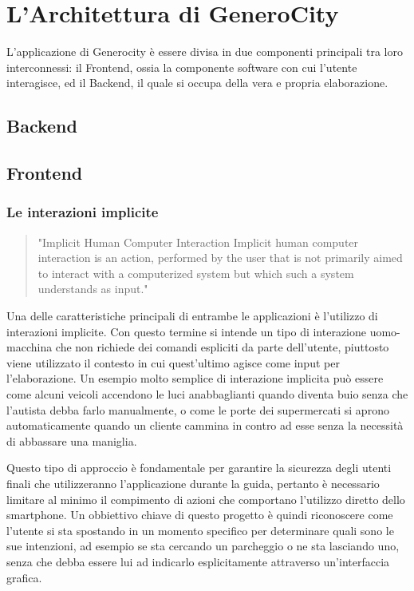 \chapter{L'Architettura di GeneroCity}

L'applicazione di Generocity è essere divisa in due componenti principali tra loro interconnessi:  il Frontend, ossia la componente software  con cui l'utente interagisce, ed il Backend, il quale si occupa della vera e propria elaborazione.
\section{Backend}
\section{Frontend}
\subsection{Le interazioni implicite}
\begin{quote}
"Implicit Human Computer Interaction
Implicit human computer interaction is an action,
performed by the user that is not primarily aimed
to interact with a computerized system but which
such a system understands as input."\cite{implicit-interaction}
\end{quote}
Una delle caratteristiche principali di entrambe le applicazioni è l'utilizzo di interazioni implicite. Con questo termine si intende un tipo di interazione uomo-macchina che non richiede dei comandi espliciti da parte dell'utente, piuttosto viene utilizzato il contesto in cui quest'ultimo agisce come input per l'elaborazione. Un esempio molto semplice di interazione implicita può essere come alcuni veicoli accendono le luci anabbaglianti quando diventa buio senza che l'autista debba farlo manualmente, o come le porte dei supermercati si aprono automaticamente quando un cliente cammina in contro ad esse senza la necessità di abbassare una maniglia. 

Questo tipo di approccio è fondamentale per garantire la sicurezza degli utenti finali che utilizzeranno l'applicazione durante la guida, pertanto è necessario limitare al minimo il compimento di azioni che comportano l'utilizzo diretto dello smartphone. Un obbiettivo chiave di questo progetto è quindi riconoscere come l'utente si sta spostando in un momento specifico per determinare quali sono le sue intenzioni, ad esempio se sta cercando un parcheggio o ne sta lasciando uno, senza che debba essere lui ad indicarlo esplicitamente attraverso un'interfaccia grafica.
